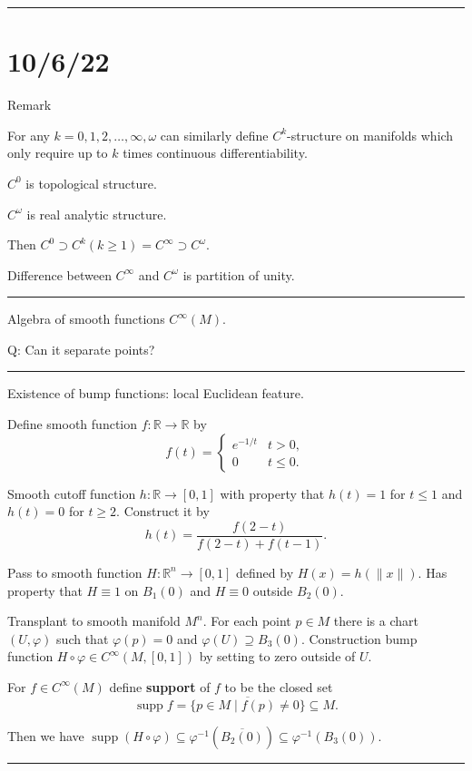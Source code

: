 \documentclass[12pt]{article}
\newcommand{\keyword}[1]{\textbf{#1}}
\newcommand{\sepline}{\rule{\textwidth}{0.4pt}}
\theoremstyle{definition}
\newcommand{\R}{\mathbb{R}}
\renewcommand{\phi}{\varphi}
\newcommand{\<}{\left\langle}
\renewcommand{\>}{\right\rangle}
\newcommand{\seq}{\subseteq}
\DeclareMathOperator{\supp}{supp}
\newcommand{\clo}{\overline}
\begin{document}
\sepline

\section*{10/6/22}

Remark

For any $k = 0, 1, 2, \dots, \infty, \omega$ can similarly define $C^k$-structure on manifolds which only require up to $k$ times continuous differentiability.

$C^0$ is topological structure.

$C^\omega$ is real analytic structure.

Then $C^0 \supset C^k (k \geq 1) = C^\infty \supset C^\omega$.

Difference between $C^\infty$ and $C^\omega$ is partition of unity.

\sepline

Algebra of smooth functions $C^\infty(M)$.

Q: Can it separate points?

\sepline

Existence of bump functions: local Euclidean feature.

Define smooth function $f : \R \to \R$ by
\[
    f(t) = \begin{cases}
        e^{-1/t} & t > 0, \\
        0 & t \leq 0.
    \end{cases}
\]

Smooth cutoff function $h : \R \to [0, 1]$ with property that $h(t) = 1$ for $t \leq 1$ and $h(t) = 0$ for $t \geq 2$.
Construct it by
\[
    h(t) = \frac{f(2 - t)}{f(2 - t) + f(t - 1)}.
\]

Pass to smooth function $H : \R^n \to [0, 1]$ defined by $H(x) = h(\|x\|)$.
Has property that $H \equiv 1$ on $B_1(0)$ and $H \equiv 0$ outside $B_2(0)$.

Transplant to smooth manifold $M^n$.
For each point $p \in M$ there is a chart $(U, \phi)$ such that $\phi(p) = 0$ and $\phi(U) \supseteq B_3(0)$.
Construction bump function $H \circ \phi \in C^\infty(M, [0, 1])$ by setting to zero outside of $U$.

For $f \in C^\infty(M)$ define \keyword{support} of $f$ to be the closed set
\[
    \supp f = \clo{\{p \in M \mid f(p) \ne 0\}} \seq M.
\]

Then we have $\supp(H \circ \phi) \seq \phi^{-1}(\clo{B_2(0)}) \seq \phi^{-1}(B_3(0))$.

\sepline
\end{document}
